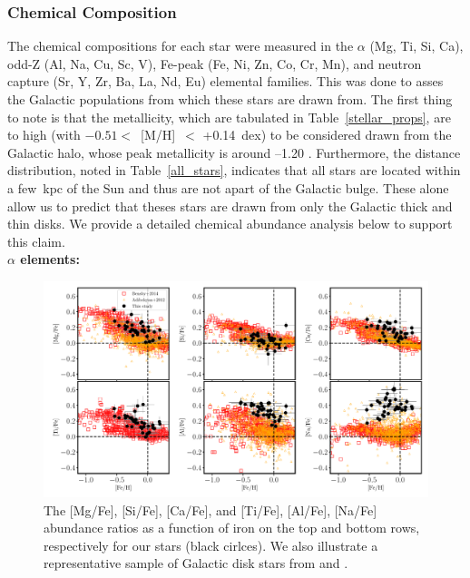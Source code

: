 \documentclass[a4paper,fleqn,usenatbib]{mnras}
\begin{document}
\subsubsection{Chemical Composition}
\label{chemical}
The chemical compositions for each star were measured in the $\alpha$ (Mg, Ti, Si, Ca), odd-Z (Al, Na, Cu, Sc, V), Fe-peak (Fe, Ni, Zn, Co, Cr, Mn), and neutron capture (Sr, Y, Zr, Ba, La, Nd, Eu) elemental families. This was done to asses the Galactic populations from which these stars are drawn from. The first thing to note is that the metallicity, which are tabulated in Table~\ref{stellar_props}, are to high (with $-0.51<$~[M/H]~$<$ +0.14~dex) to be considered drawn from the Galactic halo, whose peak metallicity is around --1.20 \cite[e.g.][]{Chiba2000}. Furthermore, the distance distribution, noted in Table~\ref{all_stars}, indicates that all stars are located within a few~kpc of the Sun and thus are not apart of the Galactic bulge. These alone allow us to predict that theses stars are drawn from only the Galactic thick and thin disks. We provide a detailed chemical abundance analysis below to support this claim.\\
{\bf $\alpha$ elements:}\\
\begin{figure}
\noindent\includegraphics[width=\textwidth,keepaspectratio]{Pope_spectra_alphaele.pdf}

\caption{\label{alphael}
The [Mg/Fe], [Si/Fe], [Ca/Fe], and [Ti/Fe], [Al/Fe], [Na/Fe] abundance ratios as a function of iron on the top and bottom rows, respectively for our stars (black cirlces). We also illustrate a representative sample of Galactic disk stars from \citet[open red square,][]{Bensby2014} and \citet[open orange triangles,][]{Adibekyan2012}. } 
\end{figure}
\end{document}

